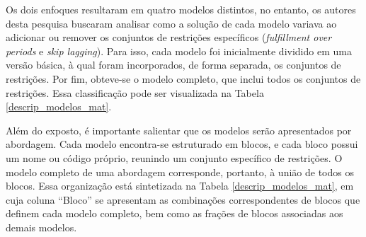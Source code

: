 Os dois enfoques resultaram em quatro modelos distintos, no entanto, os autores desta pesquisa buscaram analisar como a solução de cada modelo variava ao adicionar ou remover os conjuntos de restrições específicos (\textit{fulfillment over periods} e \textit{skip lagging}). Para isso, cada modelo foi inicialmente dividido em uma versão básica, à qual foram incorporados, de forma separada, os conjuntos de restrições. Por fim, obteve-se o modelo completo, que inclui todos os conjuntos de restrições. Essa classificação pode ser visualizada na Tabela \ref{descrip_modelos_mat}.

Além do exposto, é importante salientar que os modelos serão apresentados por abordagem. Cada modelo encontra-se estruturado em blocos, e cada bloco possui um nome ou código próprio, reunindo um conjunto específico de restrições. O modelo completo de uma abordagem corresponde, portanto, à união de todos os blocos. Essa organização está sintetizada na Tabela \ref{descrip_modelos_mat}, em cuja coluna “Bloco” se apresentam as combinações correspondentes de blocos que definem cada modelo completo, bem como as frações de blocos associadas aos demais modelos.



